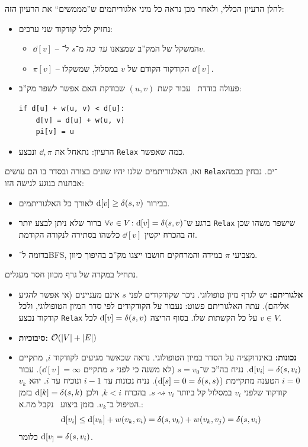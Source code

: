 \documentclass[]{../../../../tex/classes/styledArticle}
\newcommand\squig{\rightsquigarrow}
\begin{document}
	להלן הרעיון הכללי, ולאחר מכן נראה כל מיני אלגוריתמים ש''מממשים`` את הרעיון הזה: 
	
	
	\begin{itemize}
		\item נחזיק לכל קודקוד שני ערכים: 
		\begin{itemize}
			\item $\dd[v]$ – המשקל של המק''ב שמצאנו \textit{עד כה} מ־$s$ ל־$v$. 
			\item $\pi[v]$ – הקודקוד הקודם של $v$ במסלול, שמשקלו $\dd[v]$. 
		\end{itemize}
		\item פעולה בודדת  \ עבור קשת $(u, v)$ שבודקת האם אפשר לשפר מק''ב: 
		\sen\begin{lstlisting}
if d[u] + w(u, v) < d[u]:
	d[v] = d[u] + w(u, v)
	pi[v] = u\end{lstlisting}\she
		\item הרעיון: נתאחל את $\dd, \pi$ ונבצע \texttt{Relax} כמה שאפשר. 
	\end{itemize}
	ואז, האלגוריתמים שלנו יהיו שונים בצורה ובסדר בו הם עושים \texttt{Relax}־ים. 
	נבחין בכמה אבחנות בנוגע לגישה הזו: 
	\begin{itemize}
		\item בבירור $\mathrm{d}[v] \ge \delta(s, v)$ לאורך כל האלגוריתמים. 
		\item ברגע ש־$\forall v \in V\colon \mathrm{d}[v] = \delta(s, v)$ ברור שלא ניתן לבצע יותר \texttt{Relax} שישפר משהו שכן זה בהכרח יקטין $\dd[v]$ כלשהו בסתירה לנקודה הקודמת. 
		\item בדומה ל־BFS, מצביעי $\pi$ במידה והמרחקים חושבו ייצגו מק''ב בהיפוך כיוון. 
	\end{itemize}
	
	נתחיל במקרה של גרף מכוון חסר מעגלים. 
	\begin{itemize}
		\item \textbf{אלגוריתם: }יש לגרף מיון טופולוגי. ניכר שקודקודים לפני $s$ אינם מעניינים (אי אפשר להגיע אליהם). עתה האלגוריתם פשוט: נעבור על הקודקודים לפי סדר המיון הטופולוגי, ולכל קודקוד נבצע \texttt{Relax} על כל הקשתות שלו. בסוף הריצה $\mathrm{d}[v] = \delta(s, v)$ לכל $v \in V$. 
		\item \textbf{סיבוכיות: }$\mathcal{O}(\left \lvert V \right \rvert + \left \lvert E \right \rvert)$
		\item \textbf{נכונות: }באינדוקציה על הסדר במיון הטופולוגי. נראה שכאשר מגיעים לקודקוד $i$, מתקיים $\mathrm{d}[v_i] = \delta(s, v_i)$. נניח בה''כ ש־$s = v_0$ (לא משנה כי לפני $s$ מתקיים $\dd[v] = \infty$). עבור $i = 0$ הטענה מתקיימת ($\mathrm{d}[s] = 0 = \delta(s, s)$). נניח נכונות עד $i - 1$ ונוכיח עד $i$. יהא $v_k$ קודקוד שלפני $v_i$ במסלול קל ביותר $s \squig v_i$. בהכרח $k < i$, ולכן $\mathrm{d}[k] = \delta(s, k)$ בזמן הטיפול ב־$v_k$. בזמן ביצוע \  נקבל מה.א.: 
		\[ \mathrm{d}[v_i] \le \mathrm{d}[v_k] + w(v_k, v_i) = \delta(s, v_k) + w(v_k, v_j) = \delta(s, v_i) \]
		כלומר $\mathrm{d}[v_] = \delta(s, v_i)$. 
	\end{itemize}
	
\end{document}
